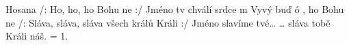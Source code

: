 \begin{TEXT}{Hosana}
\SLOKA /: Ho, ho, ho Bohu  ne :/ \NL
{}Jméno  tv chválí  srdce m \NL
{} Vyvý buď ó  , ho Bohu  ne 
\SLOKA /: Sláva, sláva, sláva všech králů Králi :/ \NL
Jméno slavíme tvé… \NL
… sláva tobě Králi náš. 
\SLOKA = 1. \NL
\end{TEXT}
